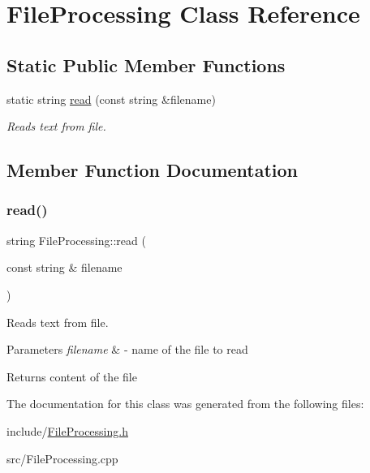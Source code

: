 \hypertarget{class_file_processing}{}\section{File\+Processing Class Reference}
\label{class_file_processing}
\subsection*{Static Public Member Functions}
\begin{DoxyCompactItemize}
\item 
static string \hyperlink{class_file_processing_ad23ba75e504f5ae67425f33d78309849}{read} (const string \&filename)
\begin{DoxyCompactList}\small\item\em Reads text from file. \end{DoxyCompactList}\end{DoxyCompactItemize}


\subsection{Member Function Documentation}
\mbox{\label{class_file_processing_ad23ba75e504f5ae67425f33d78309849}} 
\subsubsection{\texorpdfstring{read()}{read()}}
{\footnotesize\ttfamily string File\+Processing\+::read (\begin{DoxyParamCaption}\item[{const string \&}]{filename }\end{DoxyParamCaption})\hspace{0.3cm}{\ttfamily [static]}}



Reads text from file. 


\begin{DoxyParams}{Parameters}
{\em filename} & -\/ name of the file to read \\
\hline
\end{DoxyParams}
\begin{DoxyReturn}{Returns}
content of the file 
\end{DoxyReturn}


The documentation for this class was generated from the following files\+:\begin{DoxyCompactItemize}
\item 
include/\hyperlink{_file_processing_8h}{File\+Processing.\+h}\item 
src/File\+Processing.\+cpp\end{DoxyCompactItemize}
